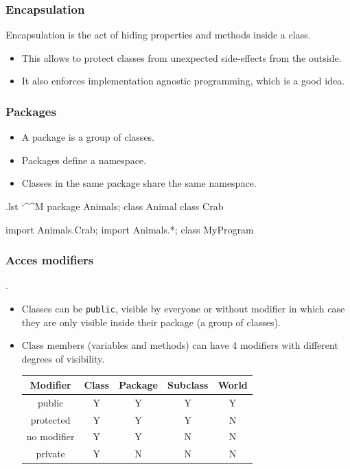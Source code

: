 \documentclass[10pt, handout]{beamer}
\makeatletter
\newenvironment{code}{%
  \begingroup
  \@bsphack
  \immediate\openout\lstvrb@out\jobname.lst
  \let\do\@makeother\dospecials\catcode`\^^M\active
  \def\verbatim@processline{%
    \immediate\write\lstvrb@out{\the\verbatim@line}}%
  \verbatim@start}{%
  \immediate\closeout\lstvrb@out
  \@esphack
  \endgroup
  
  \begin{alertblock}{}
    
  \end{alertblock}}
\makeatother
\begin{document}
\begin{frame}
  \frametitle{Encapsulation}
  \begin{definition}
  Encapsulation is the act of hiding properties and methods inside a class.
  \end{definition}
  \begin{itemize}
    \item This allows to protect classes from unexpected side-effects from the outside.
    \item It also enforces implementation agnostic programming, which is a good idea.
  \end{itemize}
\end{frame}

\begin{frame}[fragile]
  \frametitle{Packages}
  \begin{definition}
  \begin{itemize}
    \item A \alert{package} is a group of classes.
    \item Packages define a \alert{namespace}.
    \item Classes in the same package share the same \alert{namespace}. 
  \end{itemize}
  \end{definition}
  \begin{code}
    package Animals;
    class Animal{}
    class Crab{}

    import Animals.Crab;
    import Animals.*;
    class MyProgram{}
  \end{code}
\end{frame}

\begin{frame}[fragile]
  \frametitle{Acces modifiers}
  .
  \begin{itemize}
    \item Classes can be \alert{\verb!public!}, visible by everyone \newline
          or \alert{without modifier} in which case they are only visible inside their package (a group of classes).
    \item Class members (variables and methods) can have 4 modifiers with different degrees of visibility.
    \newline
    \begin{longtable}{|c|c|c|c|c|}
    \hline
    Modifier    & Class & Package & Subclass & World \\
    \hline
    public      & Y     & Y       & Y        & Y \\
    \hline
    protected   & Y     & Y       & Y        & N \\
    \hline
    no modifier & Y     & Y       & N        & N \\
    \hline
    private     & Y     & N       & N        & N \\
    \hline
    \end{longtable}
  \end{itemize}
\end{frame}
\end{document}
